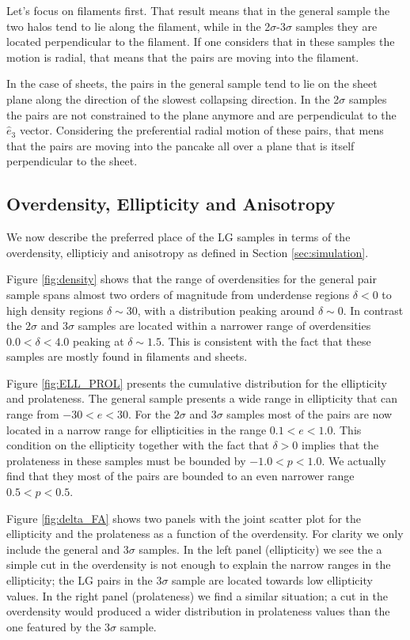 \documentclass{emulateapj}
\begin{document}
Let's focus on filaments first. That result means that in the general
sample the two halos tend to lie along the filament, while in the
2$\sigma$-3$\sigma$ samples they are located perpendicular to the
filament. If one considers that in these samples the motion is radial,
that means that the pairs are moving into the filament.

In the case of sheets, the pairs in the general sample tend to lie on
the sheet plane along the direction of the slowest collapsing
direction. In the 2$\sigma$ samples the pairs are not constrained to
the plane anymore and are perpendiculat to the $\hat{e}_3$
vector. Considering the preferential radial motion of these pairs,
that mens that the pairs are moving into the pancake all over a plane that
is itself perpendicular to the sheet. 


\subsection{Overdensity, Ellipticity and Anisotropy}


We now describe the preferred place of the LG samples in terms of the
overdensity, ellipticiy and anisotropy as defined in Section
\ref{sec:simulation}. 

Figure \ref{fig:density} shows that the range of overdensities for the
general pair sample spans almost two orders of magnitude from
underdense regions $\delta<0$ to high density regions $\delta\sim 30$,
with a distribution peaking around $\delta \sim 0$. In contrast the
$2\sigma$ and $3\sigma$ samples are located within a narrower range of
overdensities $0.0<\delta<4.0$ peaking at $\delta \sim 1.5$. This is
consistent with the fact that these samples are mostly found in
filaments and sheets.   

Figure \ref{fig:ELL_PROL} presents the cumulative distribution for
the ellipticity and prolateness. The general sample presents a wide
range in ellipticity that can range from $-30<e<30$. For the $2\sigma$
and $3\sigma$ samples most of the pairs are now located in a narrow
range for ellipticities in the range $0.1<e<1.0$. This condition on
the ellipticity together with the fact that $\delta>0$ implies that
the prolateness in these samples must be bounded by
$-1.0<p<1.0$. We actually find that they most of the pairs are bounded
to an even narrower range $0.5<p<0.5$. 

Figure \ref{fig:delta_FA} shows two panels with the joint scatter plot
for the ellipticity and the prolateness as a function of the
overdensity. For clarity we only include the general and $3\sigma$
samples. In the left panel (ellipticity) we see the a simple cut in
the overdensity is not enough to explain the narrow ranges in the
ellipticity; the LG pairs in the $3\sigma$ sample are located towards
low ellipticity values. In the right panel (prolateness) we find a
similar situation; a cut in the overdensity would produced a wider
distribution in prolateness values than the one featured by the
$3\sigma$ sample.
\end{document}
